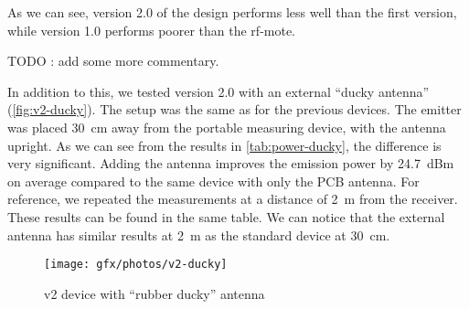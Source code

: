 \bigskip
As we can see, version 2.0 of the design performs less well than the first
version, while version 1.0 performs poorer than the rf-mote.

TODO : add some more commentary.

In addition to this, we tested version 2.0 with an external ``ducky antenna''
(\autoref{fig:v2-ducky}). The setup was the same as for the previous devices.
The emitter was placed \SI{30}{cm} away from the portable measuring device, with
the antenna upright. As we can see from the results in
\autoref{tab:power-ducky}, the difference is very significant. Adding the
antenna improves the emission power by \SI{24.7}{dBm} on average compared to the
same device with only the PCB antenna.
For reference, we repeated the measurements at a distance of \SI{2}{m} from the
receiver. These results can be found in the same table. We can notice that the
external antenna has similar results at \SI{2}{m} as the standard device at
\SI{30}{cm}.

\begin{figure}[bth]
  \begin{center}
    \texttt{[image: gfx/photos/v2-ducky]}
  \end{center}
  \caption{v2 device with ``rubber ducky'' antenna}
  \label{fig:v2-ducky}
\end{figure}


